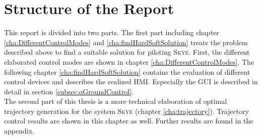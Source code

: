 \section{Structure of the Report}
\label{structure}
This report is divided into two parts. The first part including chapter \ref{cha:DifferentControlModes} and \ref{cha:findHardSoftSolution} treats the problem described above to find a suitable solution for piloting \textsc{Skye}. First, the different elaborated control modes are shown in chapter \ref{cha:DifferentControlModes}. The following chapter \ref{cha:findHardSoftSolution} contains the evaluation of different control devices and describes the realized HMI. Especially the GUI is described in detail in section \ref{subsec:qGroundControl}. \\ The second part of this thesis is a more technical elaboration of optimal trajectory generation for the system \textsc{Skye} (chapter \ref{cha:trajectory}). Trajectory control results are shown in this chapter as well. Further results are found in the appendix.